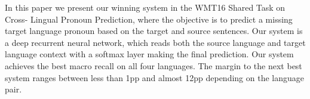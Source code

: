 In this paper we present our winning system in the WMT16 Shared Task on Cross- Lingual Pronoun Prediction, where the objective is to predict a missing target language pronoun based on the target and source sentences. Our system is a deep recurrent neural network, which reads both the source language and target language context with a softmax layer making the final prediction. Our system achieves the best macro recall on all four languages. The margin to the next best system ranges between less than 1pp and almost 12pp depending on the language pair.
